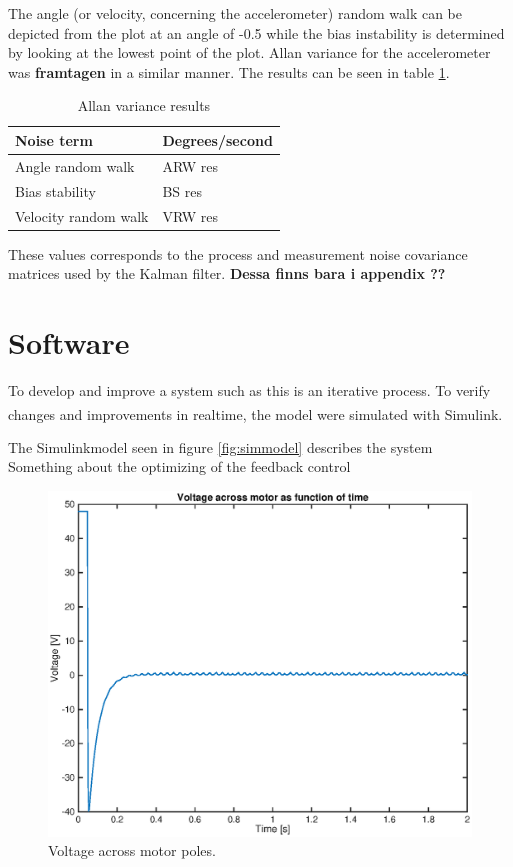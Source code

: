 \documentclass[a4paper,11pt]{kth-mag}
\begin{document}
The angle (or velocity, concerning the accelerometer) random walk can be depicted from the plot at an angle of -0.5 while the bias instability is determined by looking at the lowest point of the plot. Allan variance for the accelerometer was \textbf{framtagen} in a similar manner.  The results can be seen in table \ref{Table: Allan variance}.

\begin{table}[!hbt]
\centering
    \begin{tabular}{| l | l |} \hline
    Noise term & Degrees/second \\ \hline
    Angle random walk & ARW res \\ \hline
    Bias stability & BS res \\ \hline
    Velocity random walk & VRW res \\
    \hline
    \end{tabular}
    \caption{Allan variance results}
    \label{Table: Allan variance}
\end{table}

These values corresponds to the process and measurement noise covariance matrices used by the Kalman filter. \textbf{Dessa finns bara i appendix ??} 

\section{Software}
To develop and improve a system such as this is an iterative process. To verify changes and improvements in realtime, the model were simulated with Simulink\textsuperscript{\textregistered}. 



The Simulinkmodel seen in figure \ref{fig:simmodel} describes the system
\\ Something about the  optimizing of the feedback control
\begin{figure}[!htb]
\centering
\includegraphics[scale=.7]{voltageplot.eps}
\caption{Voltage across motor poles.}
\label{fig:voltageplot}
\end{figure}
\end{document}
